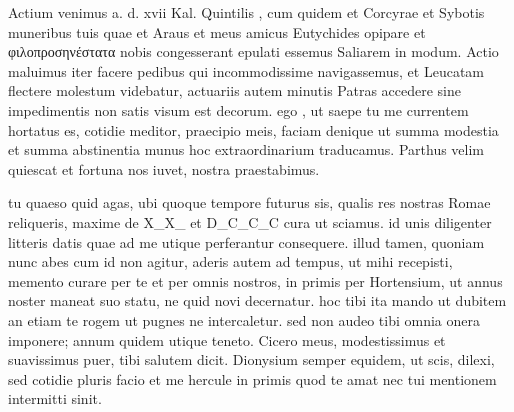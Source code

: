 


 Actium venimus a. d. xvii Kal. Quintilis , cum quidem et Corcyrae et Sybotis muneribus tuis quae et Araus et meus amicus Eutychides opipare et φιλοπροσηνέστατα nobis congesserant epulati essemus Saliarem in modum. Actio maluimus iter facere pedibus qui incommodissime navigassemus, et Leucatam flectere molestum videbatur, actuariis autem minutis Patras accedere sine impedimentis non satis visum est decorum. ego , ut saepe tu me currentem hortatus es, cotidie meditor, praecipio meis, faciam denique ut summa modestia et summa abstinentia munus hoc extraordinarium traducamus. Parthus velim quiescat et fortuna nos iuvet, nostra praestabimus.

 tu quaeso quid agas, ubi quoque tempore futurus sis, qualis res nostras Romae reliqueris, maxime de X_X_ et D_C_C_C cura ut sciamus. id unis diligenter litteris datis quae ad me utique perferantur consequere. illud tamen, quoniam nunc abes cum id non agitur, aderis autem ad tempus, ut mihi recepisti, memento curare per te et per omnis nostros, in primis per Hortensium, ut annus noster maneat suo statu, ne quid novi decernatur. hoc tibi ita mando ut dubitem an etiam te rogem ut pugnes ne intercaletur. sed non audeo tibi omnia onera imponere; annum quidem utique teneto. Cicero meus, modestissimus et suavissimus puer, tibi salutem dicit. Dionysium semper equidem, ut scis, dilexi, sed cotidie pluris facio et me hercule in primis quod te amat nec tui mentionem intermitti sinit.
